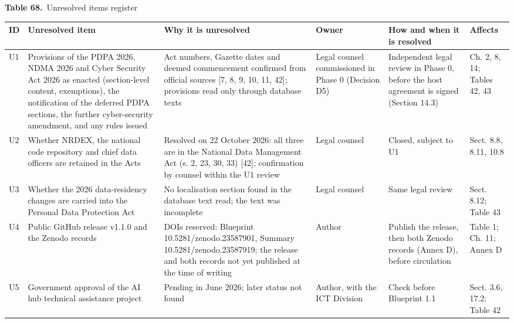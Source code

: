 \documentclass[border=10pt]{standalone}
\begin{document}
\begin{minipage}{22cm}
{\large\bfseries Table 68.}\ {\large Unresolved items register}\par\vspace{7pt}
\small
{}
\begin{tabularx}{\linewidth}{@{}>{\hsize=0.340\hsize\raggedright\arraybackslash}X>{\hsize=1.472\hsize\raggedright\arraybackslash}X>{\hsize=1.245\hsize\raggedright\arraybackslash}X>{\hsize=0.906\hsize\raggedright\arraybackslash}X>{\hsize=1.132\hsize\raggedright\arraybackslash}X>{\hsize=0.906\hsize\raggedright\arraybackslash}X@{}}
\arrayrulecolor{bapilrule}\toprule
\rowcolor{white}\textbf{ID} & \textbf{Unresolved item} & \textbf{Why it is unresolved} & \textbf{Owner} & \textbf{How and when it is resolved} & \textbf{Affects} \\
\midrule
U1 & Provisions of the PDPA 2026, NDMA 2026 and Cyber Security Act 2026 as enacted (section-level content, exemptions), the notification of the deferred PDPA sections, the further cyber-security amendment, and any rules issued & Act numbers, Gazette dates and deemed commencement confirmed from official sources [7, 8, 9, 10, 11, 42]; provisions read only through database texts & Legal counsel commissioned in Phase 0 (Decision D5) & Independent legal review in Phase 0, before the host agreement is signed (Section 14.3) & Ch. 2, 8, 14; Tables 42, 43 \\
U2 & Whether NRDEX, the national code repository and chief data officers are retained in the Acts & Resolved on 22 October 2026: all three are in the National Data Management Act (s. 2, 23, 30, 33) [42]; confirmation by counsel within the U1 review & Legal counsel & Closed, subject to U1 & Sect. 8.8, 8.11, 10.8 \\
U3 & Whether the 2026 data-residency changes are carried into the Personal Data Protection Act & No localisation section found in the database text read; the text was incomplete & Legal counsel & Same legal review & Sect. 8.12; Table 43 \\
U4 & Public GitHub release v1.1.0 and the Zenodo records & DOIs reserved: Blueprint 10.5281/\allowbreak{}zenodo.23587901, Summary 10.5281/\allowbreak{}zenodo.23587919; the release and both records not yet published at the time of writing & Author & Publish the release, then both Zenodo records (Annex D), before circulation & Table 1; Ch. 11; Annex D \\
U5 & Government approval of the AI hub technical assistance project & Pending in June 2026; later status not found & Author, with the ICT Division & Check before Blueprint 1.1 & Sect. 3.6, 17.2; Table 42 \\

\end{tabularx}
\end{minipage}
\end{document}
